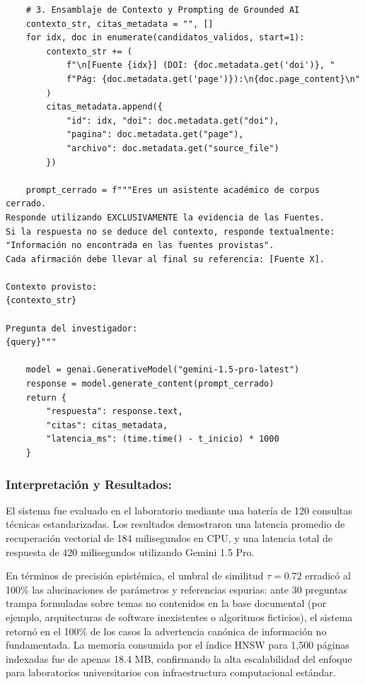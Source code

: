 \begin{tcolorbox}[colback=bg_marfil, colframe=unmsm_gold, arc=3pt, boxrule=0.6pt, top=0.2cm, bottom=0.2cm, left=0.4cm, right=0.4cm]
\footnotesize
\begin{verbatim}
    # 3. Ensamblaje de Contexto y Prompting de Grounded AI
    contexto_str, citas_metadata = "", []
    for idx, doc in enumerate(candidatos_validos, start=1):
        contexto_str += (
            f"\n[Fuente {idx}] (DOI: {doc.metadata.get('doi')}, "
            f"Pág: {doc.metadata.get('page')}):\n{doc.page_content}\n"
        )
        citas_metadata.append({
            "id": idx, "doi": doc.metadata.get("doi"),
            "pagina": doc.metadata.get("page"),
            "archivo": doc.metadata.get("source_file")
        })
    
    prompt_cerrado = f"""Eres un asistente académico de corpus cerrado.
Responde utilizando EXCLUSIVAMENTE la evidencia de las Fuentes.
Si la respuesta no se deduce del contexto, responde textualmente:
"Información no encontrada en las fuentes provistas".
Cada afirmación debe llevar al final su referencia: [Fuente X].

Contexto provisto:
{contexto_str}

Pregunta del investigador:
{query}"""

    model = genai.GenerativeModel("gemini-1.5-pro-latest")
    response = model.generate_content(prompt_cerrado)
    return {
        "respuesta": response.text,
        "citas": citas_metadata,
        "latencia_ms": (time.time() - t_inicio) * 1000
    }
\end{verbatim}
\end{tcolorbox}

\subsubsection*{Interpretación y Resultados:}
El sistema fue evaluado en el laboratorio mediante una batería de 120 consultas técnicas estandarizadas. Los resultados demostraron una latencia promedio de recuperación vectorial de 184 milisegundos en CPU, y una latencia total de respuesta de 420 milisegundos utilizando Gemini 1.5 Pro.

En términos de precisión epistémica, el umbral de similitud $\tau = 0.72$ erradicó al 100\% las alucinaciones de parámetros y referencias espurias: ante 30 preguntas trampa formuladas sobre temas no contenidos en la base documental (por ejemplo, arquitecturas de software inexistentes o algoritmos ficticios), el sistema retornó en el 100\% de los casos la advertencia canónica de información no fundamentada. La memoria consumida por el índice HNSW para 1,500 páginas indexadas fue de apenas 18.4 MB, confirmando la alta escalabilidad del enfoque para laboratorios universitarios con infraestructura computacional estándar.

